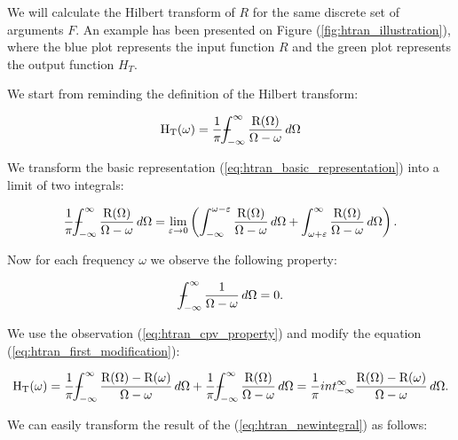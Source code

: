 \documentclass[12pt,twoside,a4paper]{article}
\numberwithin{equation}{subsection}
\numberwithin{figure}{subsection}
\def\Xint#1{\mathchoice
{\XXint\displaystyle\textstyle{#1}}%
{\XXint\textstyle\scriptstyle{#1}}%
{\XXint\scriptstyle\scriptscriptstyle{#1}}%
{\XXint\scriptscriptstyle\scriptscriptstyle{#1}}%
\!\int}
\def\XXint#1#2#3{{\setbox0=\hbox{$#1{#2#3}{\int}$ }\vcenter{\hbox{$#2#3$ }}\kern-.6\wd0}}
\def\dashint{\Xint-}
\begin{document}
We will calculate the Hilbert transform of $R$ for the same discrete set of arguments $F$. An example has been presented on Figure (\ref{fig:htran_illustration}), where the blue plot represents the input function $R$ and the green plot represents the output function $H_T$.


We start from reminding the definition of the Hilbert transform:

\begin{equation} \label{eq:htran_basic_representation}
 \mathrm{H_T}(\omega )
  = \frac{1}{\pi } {\dashint_{ - \infty }^{\infty }  \frac {\mathrm{R}(\Omega )}{\Omega - \omega }\,d\Omega }
\end{equation}

We transform the basic representation (\ref{eq:htran_basic_representation}) into a limit of two integrals:

\begin{equation} \label{eq:htran_first_modification}
  \frac{1}{\pi } {\dashint_{ - \infty }^{\infty }  \frac {\mathrm{R}(\Omega )}{\Omega - \omega }\,d\Omega }
  = {\lim_{\varepsilon \rightarrow 0}} 
  	\left( \int_{ - \infty }^{\omega - \varepsilon } \frac {\mathrm{R}(\Omega )}{\Omega - \omega }\,d\Omega  
  	     + \int_{ \omega + \varepsilon }^{ \infty  } \frac {\mathrm{R}(\Omega )}{\Omega - \omega }\,d\Omega \right) .
\end{equation} 

Now for each frequency $\omega$ we observe the following property:

\begin{equation} \label{eq:htran_cpv_property}
	\dashint_{ - \infty }^{\infty } \frac {1}{\Omega  - \omega } \,d\Omega =0 .
\end{equation}

We use the observation (\ref{eq:htran_cpv_property}) and modify the equation (\ref{eq:htran_first_modification}):

\begin{equation} \label{eq:htran_newintegral}
  \mathrm{H_T}(\omega )
  = \frac{1}{\pi } {\dashint_{ - \infty }^{\infty } \frac {\mathrm{R}(\Omega ) - \mathrm{R}(\omega )}{\Omega  - \omega }\,d\Omega }
  + \frac{1}{\pi } {\dashint_{ - \infty }^{\infty } \frac {\mathrm{R}(\Omega )}{\Omega  - \omega }\,d\Omega }
  = \frac{1}{\pi }      {int_{ - \infty }^{\infty } \frac {\mathrm{R}(\Omega ) - \mathrm{R}(\omega )}{\Omega - \omega }\,d\Omega} . 
\end{equation}

We can easily transform the result of the (\ref{eq:htran_newintegral}) as follows:
\end{document}
